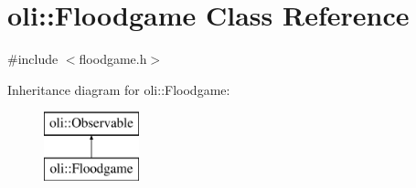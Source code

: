 \hypertarget{classoli_1_1_floodgame}{}\section{oli\+:\+:Floodgame Class Reference}
\label{classoli_1_1_floodgame}


{\ttfamily \#include $<$floodgame.\+h$>$}

Inheritance diagram for oli\+:\+:Floodgame\+:\begin{figure}[H]
\begin{center}
\leavevmode
\includegraphics[height=2.000000cm]{classoli_1_1_floodgame}
\end{center}
\end{figure}
